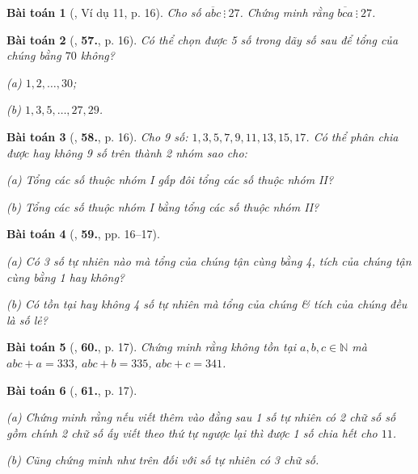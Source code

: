 \documentclass{article}
\numberwithin{equation}{section}
\newtheorem{baitoan}{Bài toán}[section]
\begin{document}
\begin{baitoan}[\cite{Binh_Toan_6_tap_1}, Ví dụ 11, p. 16]
	Cho số $\overline{abc}\ \vdots\ 27$. Chứng minh rằng $\overline{bca}\ \vdots\ 27$.
\end{baitoan}

\begin{baitoan}[\cite{Binh_Toan_6_tap_1}, \textbf{57.}, p. 16]
	Có thể chọn được 5 số trong dãy số sau để tổng của chúng bằng $70$ không?
	\begin{enumerate*}
		\item[(a)] $1,2,\ldots,30$;
		\item[(b)] $1,3,5,\ldots,27,29$.
	\end{enumerate*}
\end{baitoan}

\begin{baitoan}[\cite{Binh_Toan_6_tap_1}, \textbf{58.}, p. 16]
	Cho 9 số: $1,3,5,7,9,11,13,15,17$. Có thể phân chia được hay không 9 số trên thành 2 nhóm sao cho:
	\begin{enumerate*}
		\item[(a)] Tổng các số thuộc nhóm I gấp đôi tổng các số thuộc nhóm II?
		\item[(b)] Tổng các số thuộc nhóm I bằng tổng các số thuộc nhóm II?
	\end{enumerate*}
\end{baitoan}

\begin{baitoan}[\cite{Binh_Toan_6_tap_1}, \textbf{59.}, pp. 16--17]
	\begin{enumerate*}
		\item[(a)] Có 3 số tự nhiên nào mà tổng của chúng tận cùng bằng 4, tích của chúng tận cùng bằng 1 hay không?
		\item[(b)] Có tồn tại hay không 4 số tự nhiên mà tổng của chúng \& tích của chúng đều là số lẻ?
	\end{enumerate*}
\end{baitoan}

\begin{baitoan}[\cite{Binh_Toan_6_tap_1}, \textbf{60.}, p. 17]
	Chứng minh rằng không tồn tại $a,b,c\in\mathbb{N}$ mà $abc + a = 333$, $abc + b = 335$, $abc + c = 341$.
\end{baitoan}

\begin{baitoan}[\cite{Binh_Toan_6_tap_1}, \textbf{61.}, p. 17]
	\begin{enumerate*}
		\item[(a)] Chứng minh rằng nếu viết thêm vào đằng sau 1 số tự nhiên có 2 chữ số số gồm chính 2 chữ số ấy viết theo thứ tự ngược lại thì được 1 số chia hết cho $11$.
		\item[(b)] Cũng chứng minh như trên đối với số tự nhiên có 3 chữ số.
	\end{enumerate*}
\end{baitoan}
\end{document}
